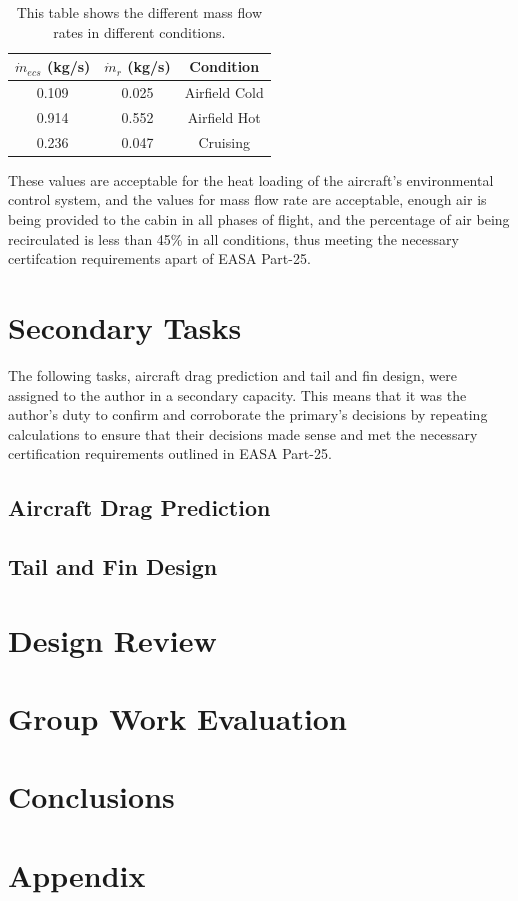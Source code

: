 \documentclass[stu, a4paper, 12pt, floatsintext]{apa7}
\numberwithin{figure}{section}
\numberwithin{table}{section}
\numberwithin{equation}{section}
\begin{document}
\begin{table}[]
    \centering
    \caption{This table shows the different mass flow rates in different conditions. }
    \label{tab:ecs_final_mass}
    \begin{tabular}{@{}ccc@{}}
    \toprule
    \textbf{$\dot m_{ecs}$ (kg/s)} & \textbf{$\dot m_r$ (kg/s)} & \textbf{Condition} \\ \midrule
    0.109                          & 0.025                      & Airfield Cold      \\
    0.914                          & 0.552                      & Airfield Hot       \\
    0.236                          & 0.047                      & Cruising           \\ \bottomrule
    \end{tabular}
\end{table}

These values are acceptable for the heat loading of the aircraft’s environmental control system, and the values for mass flow rate are acceptable, enough air is being provided to the cabin in all phases of flight, and the percentage of air being recirculated is less than 45\% in all conditions, thus meeting the necessary certifcation requirements apart of EASA Part-25. 

\section{Secondary Tasks}
The following tasks, aircraft drag prediction and tail and fin design, were assigned to the author in a secondary capacity. This means that it was the author’s duty to confirm and corroborate the primary’s decisions by repeating calculations to ensure that their decisions made sense and met the necessary certification requirements outlined in EASA Part-25.  
\subsection{Aircraft Drag Prediction}
\subsection{Tail and Fin Design}
\section{Design Review}
\section{Group Work Evaluation}
\section{Conclusions}

\section{Appendix}

\printbibliography
\end{document}
